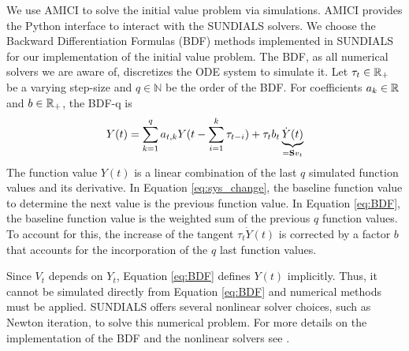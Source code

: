 We use AMICI \citep{Frohlich.2021} to solve the initial value problem via simulations. AMICI provides the Python interface to interact with the SUNDIALS \citep{Hindmarsh.2005} solvers. We choose the Backward Differentiation Formulas (BDF) methods implemented in SUNDIALS for our implementation  of the initial value problem. The BDF, as all numerical solvers we are aware of, discretizes the ODE system to simulate it. Let $\tau_t \in \mathbb{R}_+$ be a varying step-size and $q \in \mathbb{N}$ be the order of the BDF. For coefficients $a_k\in \mathbb{R}$ and $b \in \mathbb{R}_+$, the BDF-q is  
\begin{align}
\label{eq:BDF}
Y(t) = \sum_{k=1}^q a_{t,k} Y(t - \sum_{i=1}^k \tau_{t-i} ) + \tau_t b_t \underbrace{\dot{Y}(t)}_{=\mathbf{S} v_t}
\end{align}
The function value $Y(t)$ is a linear combination of the last $q$ simulated function values and its derivative. In Equation \eqref{eq:sys_change}, the baseline function value to determine the next value is the previous function value. In Equation \eqref{eq:BDF}, the baseline function value is the weighted sum of the previous $q$ function values. To account for this, the increase of the tangent $\tau_t \dot{Y}(t)$ is corrected by a factor $b$ that accounts for the incorporation of the $q$ last function values.

Since $V_t$ depends on $Y_t$, Equation \eqref{eq:BDF} defines $Y(t)$ implicitly. Thus, it cannot be simulated directly from Equation \eqref{eq:BDF} and numerical methods must be applied. SUNDIALS offers several nonlinear solver choices, such as Newton iteration, to solve this numerical problem. For more details on the implementation of the BDF and the nonlinear solvers see \cite{Hindmarsh.2019}.
 
